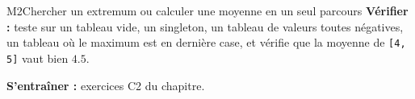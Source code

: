 \begin{fichemethode}{M2}{Chercher un extremum ou calculer une moyenne en un seul parcours}
\textbf{Vérifier :} teste sur un tableau vide, un singleton, un tableau de valeurs toutes
négatives, un tableau où le maximum est en dernière case, et vérifie que la moyenne de
\lstinline{[4, 5]} vaut bien $4.5$.

\textbf{S'entraîner :} exercices C2 du chapitre.
\end{fichemethode}
